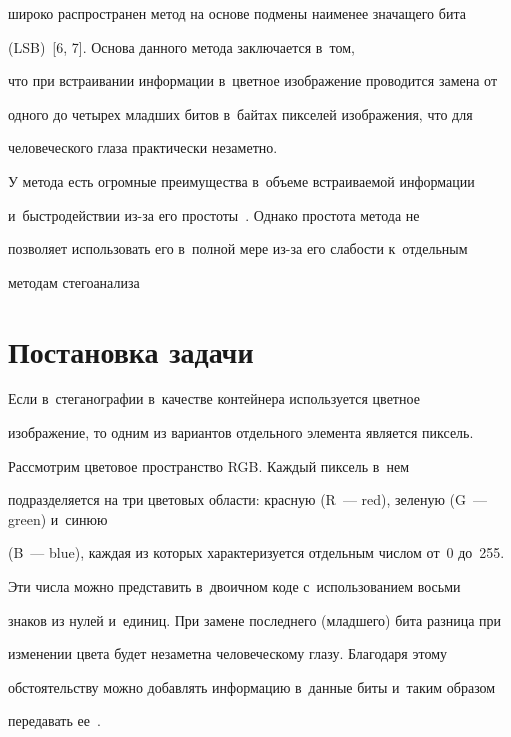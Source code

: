 широко распространен метод на основе подмены наименее значащего бита 


(LSB)~[6, 7]. Основа данного метода заключается в~том, 


что при встраивании информации в~цветное изображение проводится замена от 


одного до четырех младших битов в~байтах пикселей изображения, что для 


человеческого глаза практически незаметно.


  


  У метода есть огромные преимущества в~объеме встраиваемой информации 


  и~быстродействии из-за его простоты~\cite{8-lin}. Однако простота метода не 


позволяет использовать его в~полной мере из-за его слабости к~отдельным 


методам стегоанализа


  


  \section{Постановка задачи}


  


  Если в~стеганографии в~качестве контейнера используется цветное 


изображение, то одним из вариантов отдельного элемента является пиксель. 


Рассмотрим цветовое пространство RGB. Каждый пиксель в~нем 


подразделяется на три цветовых области: красную (R~--- red), зеленую (G~--- green) и~синюю 


(B~--- blue), каждая из которых характеризуется отдельным числом от~0 до~255. 


  


  Эти числа можно представить в~двоичном коде с~использованием восьми 


знаков из нулей и~единиц. При замене последнего (младшего) бита разница при 


изменении цвета будет незаметна человеческому глазу. Благодаря этому 


обстоятельству можно добавлять информацию в~данные биты и~таким образом 


передавать ее~\cite{7-lin}.


